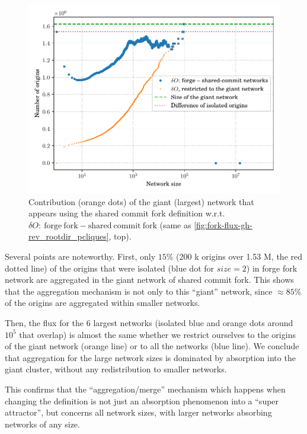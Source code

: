 \begin{figure}
    \centering
    \includegraphics[width=0.6\linewidth]{img/forks/wccdf-forges-swhrev-giant-network.pdf}
    \caption{Contribution (orange dots) of the giant (largest) network that
    appears using the shared commit fork definition w.r.t.
    $\delta O:~\mathrm{forge~fork} - \mathrm{shared~commit~fork}$ (same as
    \cref{fig:fork-flux-gh-rev_rootdir_pcliques}, top).}%
    \label{fig:fork-Diff_WCCDF_all}
\end{figure}

Several points are noteworthy.
First, only $15\%$ (200 k origins over 1.53 M, the red dotted line) of the
origins that were isolated (blue dot for $size=2$) in forge fork network
are aggregated in the giant network of shared commit fork.
This shows that the aggregation mechanism is not only to this ``giant''
network, since $\approx 85\%$ of the origins are aggregated within smaller
networks.

Then, the flux for the 6 largest networks (isolated blue and orange dots around
$10^5$ that overlap) is almost the same whether we restrict ourselves to the
origins of the giant network (orange line) or to all the networks (blue line).
We conclude that aggregation for the large network sizes is dominated by
absorption into the giant cluster, without any redistribution to smaller
networks.

This confirms that the ``aggregation/merge'' mechanism which happens when
changing the definition is not just an absorption phenomenon into a ``super
attractor'', but concerns all network sizes, with larger networks absorbing
networks of any size.



